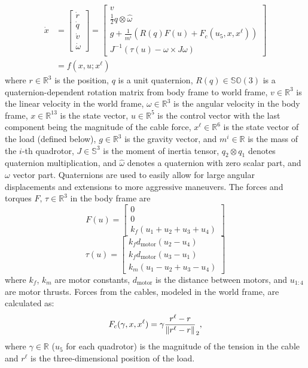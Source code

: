 \documentclass[../root.tex]{subfiles}
\begin{document}
\begin{equation} \label{eq:quad_dynamics}
\begin{aligned}
\dot{x} &=
\begin{bmatrix}
\dot{r} \\ \dot{q} \\ \dot{v} \\ \dot{\omega}
\end{bmatrix} 
= 
\begin{bmatrix}
v \\ 
\frac{1}{2} q \otimes \hat{\omega} \\
g + \frac{1}{m^i} (R(q)F(u) + F_c(u_5,x,x^\ell)) \\ 
J^{-1}(\tau(u) - \omega \times J \omega)
\end{bmatrix} \\
&= f(x,u; x^\ell)
\end{aligned}
\end{equation}
where $r \in \mathbb{R}^3$ is the position, $q$ is a unit quaternion, $R(q)
\in \mathbb{SO}(3)$ is a quaternion-dependent rotation matrix from body frame
to world frame, $v \in \mathbb{R}^3$ is the linear velocity in the world
frame, $\omega \in \mathbb{R}^3$ is the angular velocity in the body frame,
$x \in \mathbb{R}^{13}$ is the state vector, $u \in \mathbb{R}^5$ is the
control vector with the last component being the magnitude of the cable
force, $x^\ell \in \mathbb{R}^6$ is the state vector of the load (defined
below), $g \in \mathbb{R}^3$ is the gravity vector, and $m^i \in \mathbb{R}$
is the mass of the $i$-th quadrotor, $J \in \mathbb{S}^3$ is the moment of
inertia tensor, $q_2 \otimes q_1 $ denotes quaternion multiplication,
and $\hat{\omega}$ denotes a quaternion with zero scalar part, and $\omega$
vector part. Quaternions are used to easily allow for large angular
displacements and extensions to more aggressive maneuvers. The forces and
torques $F,\, \tau \in \mathbb{R}^3$ in the body frame are
\begin{equation}
	F(u) = \begin{bmatrix} 0 \\ 0 \\ k_f(u_1 + u_2 + u_3 + u_4) \end{bmatrix}
\end{equation}
\begin{equation}
\tau(u) = \begin{bmatrix} 
	k_f d_\text{motor} (u_2 - u_4) \\ 
	k_f d_\text{motor} (u_3 - u_1) \\ 
	k_m (u_1 - u_2 + u_3 - u_4)
\end{bmatrix}
\end{equation}
where $k_f$, $k_m$ are motor constants, $d_\text{motor}$ is the distance
between motors, and $u_{1:4}$ are motor thrusts. Forces from the cables,
modeled in the world frame, are calculated as:
\begin{equation}
F_c(\gamma,x,x^\ell) = \gamma \frac{r^\ell - r}{\norm{r^\ell - r}}_2,
\end{equation}
where $\gamma \in \mathbb{R}$ ($u_5$ for each quadrotor) is the magnitude of
the tension in the cable and $r^\ell$ is the three-dimensional position of
the load.
\end{document}
